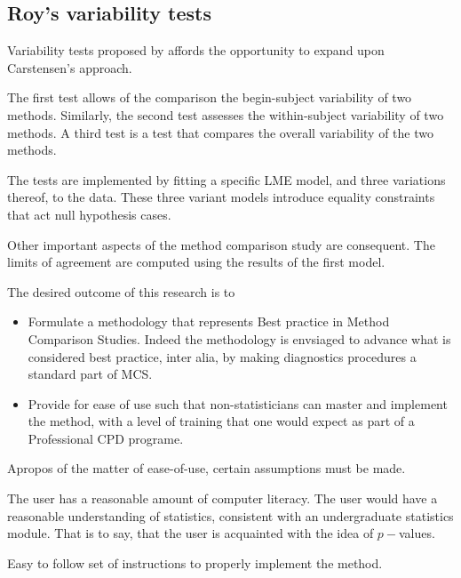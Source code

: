 \documentclass[]{article}
\begin{document}
\newpage
\subsection{Roy's variability tests}
Variability tests proposed by \citet{Roy2009} affords the opportunity to expand upon Carstensen's approach.

The first test allows of the comparison the begin-subject variability of two methods. Similarly, the second test
assesses the within-subject variability of two methods. A third test is a test that compares the overall variability of the two methods.

The tests are implemented by fitting a specific LME model, and three variations thereof, to the data. These three variant models introduce equality constraints that act null hypothesis cases.

Other important aspects of the method comparison study are consequent. The limits of agreement are computed using the results of the first model.




The desired outcome of this research is to

\begin{itemize}
	\item Formulate a methodology that represents Best practice in Method Comparison Studies. Indeed the methodology is envsiaged to advance what is considered best practice, inter alia, by making diagnostics procedures a standard part of MCS. 
	
	\item Provide for ease of use such that non-statisticians can master and implement the method, with a level of training that one would expect 
	as part of a Professional CPD programe.
	
\end{itemize}

Apropos of the matter of ease-of-use, certain assumptions must be made.


The user has a reasonable amount of computer literacy.
The user would have a reasonable understanding of statistics, consistent with an undergraduate statistics module. 
That is to say, that the user is acquainted with the idea of $p-$values.

Easy to follow set of instructions to properly implement the method.

\end{document}
